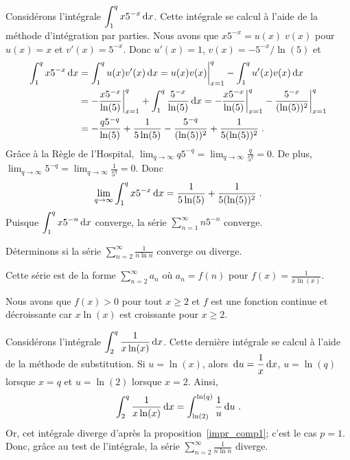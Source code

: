 {\begin{egg}
Considérons l'intégrale $\displaystyle \int_1^q x 5^{-x}\,\mathrm{d}x$.
Cette intégrale se calcul à l'aide de la méthode
d'intégration par parties.  Nous avons que
$x 5^{-x} = u(x) \; v(x)$ pour $u(x) = x$ et $v'(x) = 5^{-x}$.  Donc
$u'(x)=1$, $v(x) = -5^{-x}/\ln(5)$ et
\begin{align*}
\int_1^q x 5^{-x} \,\mathrm{d}x
&= \int_1^q u(x)v'(x)\,\mathrm{d}x
= u(x)v(x)\bigg|_{x=1}^q - \int_1^q u'(x) v(x)\,\mathrm{d}x \\
&= -\frac{x 5^{-x}}{\ln(5)}\bigg|_{x=1}^q
+ \int_1^q \frac{5^{-x}}{\ln(5)}\,\mathrm{d}x
= -\frac{x 5^{-x}}{\ln(5)}\bigg|_{x=1}^q
- \frac{5^{-x}}{(\ln(5))^2}\bigg|_{x=1}^q \\
&= -\frac{q 5^{-q}}{\ln(5)} + \frac{1}{5\ln(5)}
- \frac{5^{-q}}{(\ln(5))^2} + \frac{1}{5(\ln(5))^2} \; .
\end{align*}
Grâce à la Règle de l'Hospital,
$\displaystyle \lim_{q\rightarrow \infty}q 5^{-q} = 
\lim_{q\rightarrow \infty} \frac{q}{5^q} = 0$.  De plus,
$\displaystyle \lim_{q\rightarrow \infty} 5^{-q} =
\lim_{q\rightarrow \infty} \frac{1}{5^q} = 0$.  Donc
\[
\lim_{q\rightarrow \infty} \int_1^q x 5^{-x} \,\mathrm{d}x
= \frac{1}{5\ln(5)} + \frac{1}{5(\ln(5))^2} \; .
\]
Puisque $\displaystyle \int_1^q x 5^{-n}\,\mathrm{d}x$ converge, la série
$\displaystyle \sum_{n=1}^\infty n 5^{-n}$ converge.
\end{egg}

\begin{egg}
Déterminons si la série
$\displaystyle \sum_{n=2}^\infty \frac{1}{n\ln{n}}$ converge ou diverge.

Cette série est de la forme $\displaystyle \sum_{n=2}^\infty a_n$ où
$\displaystyle a_n = f(n)$ pour
$\displaystyle f(x) = \frac{1}{x\ln(x)}$.

Nous avons que $f(x) > 0$ pour tout $x\geq 2$ et $f$ est une fonction
continue et décroissante car $x\ln(x)$ est croissante pour $x\geq 2$.

Considérons l'intégrale $\displaystyle \int_2^q \frac{1}{x\ln(x)} \,\mathrm{d}x$.
Cette dernière intégrale se calcul à l'aide de la méthode de
substitution.  Si $u = \ln(x)$, alors
$\displaystyle \,\mathrm{d}u = \frac{1}{x} \,\mathrm{d}x$, $u = \ln(q)$ lorsque
$x=q$ et $u = \ln(2)$ lorsque $x=2$.  Ainsi,
\[
\int_2^q \frac{1}{x\ln(x)} \,\mathrm{d}x
= \int_{\ln(2)}^{\ln(q)} \frac{1}{u} \,\mathrm{d}u \ .
\]
Or, cet intégrale diverge d'après la proposition~\ref{impr_comp1};
c'est le cas $p=1$.  Donc, grâce au test de l'intégrale, la série
$\displaystyle \sum_{n=2}^\infty \frac{1}{n\ln{n}}$ diverge.
\end{egg}

}  %

